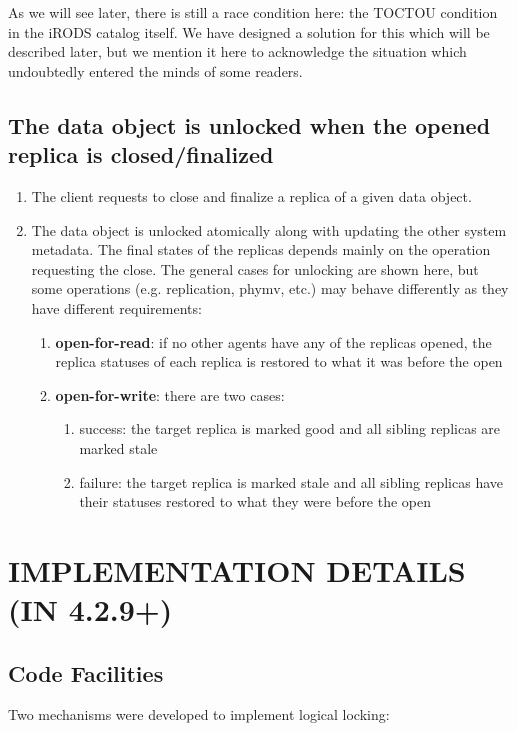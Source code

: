 \documentclass{irodsugm}
\begin{document}
As we will see later, there is still a race condition here: the TOCTOU\cite{toctou} condition in the iRODS catalog itself. We have designed a solution for this which will be described later, but we mention it here to acknowledge the situation which undoubtedly entered the minds of some readers.

\subsection*{The data object is unlocked when the opened replica is closed/finalized}

\begin{enumerate}
\item The client requests to close and finalize a replica of a given data object.
\item The data object is unlocked atomically along with updating the other system metadata. The final states of the replicas depends mainly on the operation requesting the close. The general cases for unlocking are shown here, but some operations (e.g. replication, phymv, etc.) may behave differently as they have different requirements:
   \begin{enumerate}
   \item \textbf{open-for-read}: if no other agents have any of the replicas opened, the replica statuses of each replica is restored to what it was before the open
   \item \textbf{open-for-write}: there are two cases:
      \begin{enumerate}
      \item success: the target replica is marked good and all sibling replicas are marked stale
      \item failure: the target replica is marked stale and all sibling replicas have their statuses restored to what they were before the open
      \end{enumerate}
   \end{enumerate}
\end{enumerate}

\section*{IMPLEMENTATION DETAILS (IN 4.2.9+)}
\subsection*{Code Facilities}
Two mechanisms were developed to implement logical locking:
\end{document}
